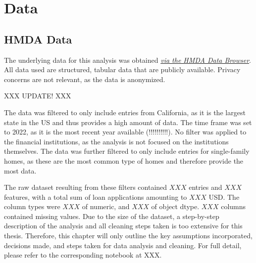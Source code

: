 \chapter{Data}\label{ch:Data}


\section{HMDA Data}\label{sec:HMDA_Data}


The underlying data for this analysis was obtained \textit{\href{https://ffiec.cfpb.gov/data-browser/data/2022?category=states}{via the HMDA Data Browser}}. \@
All data used are structured, tabular data that are publicly available. Privacy concerns are not relevant, as the data is anonymized.

XXX UPDATE! XXX

The data was filtered to only include entries from California, as it is the largest state in the US and thus provides a high amount of data. 
The time frame was set to 2022, as it is the most recent year available (!!!!!!!!!!). No filter was applied to the financial institutions, as the analysis is not focused on the institutions themselves. 
The data was further filtered to only include entries for single-family homes, as these are the most common type of homes and therefore provide the most data.

The raw dataset resulting from these filters contained $XXX$ entries and $XXX$ features, with a total sum of loan applications amounting to $XXX$ USD. The column types were $XXX$ of numeric, and $XXX$ of object dtype. $XXX$ columns contained missing values. \@
Due to the size of the dataset, a step-by-step description of the analysis and all cleaning steps taken is too extensive for this thesis. Therefore, this chapter will only outline the key assumptions incorporated, decisions made, and steps taken for data analysis and cleaning. For full detail, please refer to the corresponding notebook at XXX.

